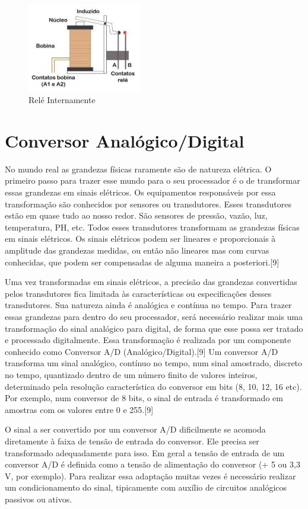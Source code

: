 \begin{figure}[H]
	\centering
	\includegraphics[width=5cm]{figuras/rele.png}
	\caption{Relé Internamente} \label{rele}
\end{figure}

\section{Conversor Analógico/Digital}

No mundo real as grandezas físicas raramente são de natureza elétrica. O primeiro passo para trazer esse mundo para o seu processador é o de transformar essas grandezas em sinais elétricos. Os equipamentos responsáveis por essa transformação são conhecidos por sensores ou transdutores. Esses transdutores estão em quase tudo ao nosso redor. São sensores de pressão, vazão, luz, temperatura, PH, etc. Todos esses transdutores transformam as grandezas físicas em sinais elétricos. Os sinais elétricos podem ser lineares e proporcionais à amplitude das grandezas medidas, ou então não lineares mas com curvas conhecidas, que podem ser compensadas de alguma maneira a posteriori.[9]

Uma vez transformadas em sinais elétricos, a precisão das grandezas convertidas pelos transdutores fica limitada às características ou especificações desses transdutores. Sua natureza ainda é analógica e contínua no tempo. Para trazer essas grandezas para dentro do seu processador, será necessário realizar mais uma transformação do sinal analógico para digital, de forma que esse possa ser tratado e processado digitalmente. Essa transformação é realizada por um componente conhecido como Conversor A/D (Analógico/Digital).[9]
Um conversor A/D transforma um sinal analógico, contínuo no tempo, num sinal amostrado, discreto no tempo, quantizado dentro de um número finito de valores inteiros, determinado pela resolução característica do conversor em bits (8, 10, 12, 16 etc). Por exemplo, num conversor de 8 bits, o sinal de entrada é transformado em amostras com os valores entre 0 e 255.[9]

O sinal a ser convertido por um conversor A/D dificilmente se acomoda diretamente à faixa de tensão de entrada do conversor. Ele precisa ser transformado adequadamente para isso. Em geral a tensão de entrada de um conversor A/D é definida como a tensão de alimentação do conversor (+ 5 ou 3,3 V, por exemplo). Para realizar essa adaptação muitas vezes é necessário realizar um condicionamento do sinal, tipicamente com auxílio de circuitos analógicos passivos ou ativos.

